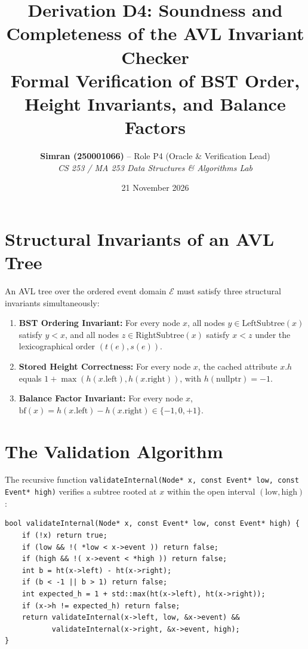 \documentclass[11pt,a4paper]{article}
\title{\textbf{Derivation D4: Soundness and Completeness of the AVL Invariant Checker}\\
\large Formal Verification of BST Order, Height Invariants, and Balance Factors}
\author{\textbf{Simran (250001066)} -- Role P4 (Oracle \& Verification Lead)\\
\textit{CS 253 / MA 253 Data Structures \& Algorithms Lab}}
\date{21 November 2026}
\begin{document}
\maketitle

\section{Structural Invariants of an AVL Tree}
An AVL tree over the ordered event domain $\mathcal{E}$ must satisfy three structural invariants simultaneously:
\begin{enumerate}
    \item \textbf{BST Ordering Invariant:} For every node $x$, all nodes $y \in \text{LeftSubtree}(x)$ satisfy $y < x$, and all nodes $z \in \text{RightSubtree}(x)$ satisfy $x < z$ under the lexicographical order $(t(e), s(e))$.
    \item \textbf{Stored Height Correctness:} For every node $x$, the cached attribute $x.h$ equals $1 + \max(h(x.\text{left}), h(x.\text{right}))$, with $h(\text{nullptr}) = -1$.
    \item \textbf{Balance Factor Invariant:} For every node $x$, $\text{bf}(x) = h(x.\text{left}) - h(x.\text{right}) \in \{-1, 0, +1\}$.
\end{enumerate}

\section{The Validation Algorithm}
The recursive function \texttt{validateInternal(Node* x, const Event* low, const Event* high)} verifies a subtree rooted at $x$ within the open interval $(\text{low}, \text{high})$:

\begin{verbatim}
bool validateInternal(Node* x, const Event* low, const Event* high) {
    if (!x) return true;
    if (low && !( *low < x->event )) return false;
    if (high && !( x->event < *high )) return false;
    int b = ht(x->left) - ht(x->right);
    if (b < -1 || b > 1) return false;
    int expected_h = 1 + std::max(ht(x->left), ht(x->right));
    if (x->h != expected_h) return false;
    return validateInternal(x->left, low, &x->event) &&
           validateInternal(x->right, &x->event, high);
}
\end{verbatim}
\end{document}
